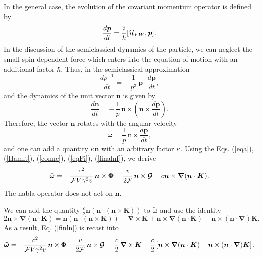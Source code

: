 \documentclass[preprint,showpacs,preprintnumbers,eqsecnum,amsmath,amssymb]{revtex4}
\begin{document}
In the general case, the evolution of the covariant 
momentum operator is defined by
\begin{eqnarray}
\frac{d\bm p}{dt}=\frac{i}{\hbar}[{\cal H}_{FW},\bm p].
\label{eqFi}\end{eqnarray} In the discussion of the semiclassical
dynamics of the particle, we can neglect the small spin-dependent force 
which enters into the equation of motion with an additional factor
$\hbar$. Thus, in the semiclassical approximation
$$\frac{dp^{-1}}{dt} = -\,\frac{1}{p^3}\,{\bm p}\cdot\frac{d{\bm p}}{dt},$$
and the dynamics of the unit vector $\bm n$ is given by
\begin{equation}
\frac{d\bm n}{dt} = -\,{\frac 1p}\,{\bm n}\times\left({\bm
n}\times \frac{d{\bm p}}{dt}\right).
\end{equation}
Therefore, the vector $\bm n$ rotates with the angular velocity
\begin{equation}\label{finalnf}
\tilde{\bm\omega} = {\frac 1p}\,{\bm n}\times \frac{d{\bm p}}{dt},
\end{equation}
and one can add a quantity $\kappa\bm n$ with an arbitrary factor
$\kappa$. Using the Eqs. (\ref{eqa}), (\ref{Hamlt}),
(\ref{conne}), (\ref{eqFi}), (\ref{finalnf}), we derive
\begin{equation}
\tilde{\bm\omega} = -\frac {c^2}{{\cal F}V\gamma^2v}\,{\bm n}\times\bm\Phi 
-\frac {v}{2{\cal F}}\,{\bm n}\times\mbox{\boldmath ${\cal G}$} 
-c\bm n\times\bm\nabla(\bm n\cdot\bm K).\label{finln}
\end{equation}
The nabla operator does not act on $\bm n$.

We can add the quantity $\frac c2\bm n(\bm n\cdot(\bm n\times\bm
K))$ to $\tilde{\bm\omega}$ and use the identity
$$2\bm n\times\bm\nabla(\bm n\cdot\bm K)=\bm n(\bm n\cdot(\bm n\times\bm K))
-\bm{\nabla}\times\bm{K}+\bm n\times\bm\nabla(\bm n\cdot\bm
K)+\bm{n}\times (\bm{n}\cdot\bm\nabla)\bm{K}.$$ As a result, Eq.
(\ref{finln}) is recast into
\begin{equation}
\tilde{\bm\omega} = -\frac {c^2}{{\cal F}V\gamma^2v}\,{\bm
n}\times\bm\Phi -\frac {v}{2{\cal F}}\,{\bm n}\times\mbox{\boldmath 
${\cal G}$}+\,{\frac c2}\,\bm{\nabla}\times\bm{K} - {\frac
c2}\left[\bm{n}\times\bm{\nabla}(\bm{n}\cdot
\bm{K})+\bm{n}\times(\bm{n}\cdot\bm\nabla)\bm{K}\right].\label{finlf}
\end{equation}
\end{document}
